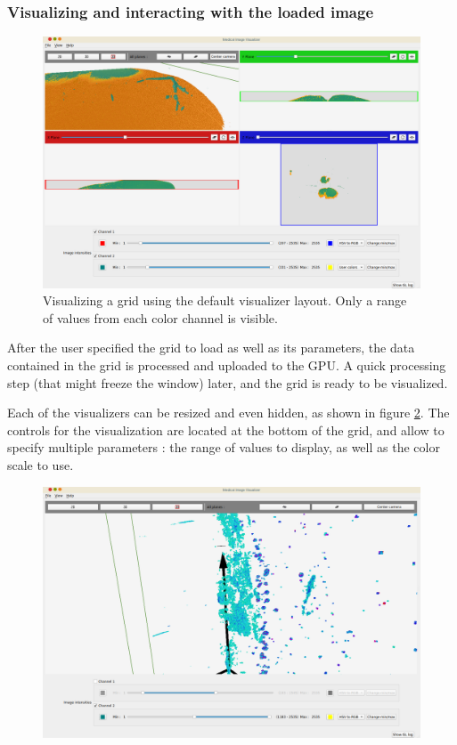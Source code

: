 {	%
	\subsubsection{Visualizing and interacting with the loaded image}
	{
		\begin{figure}[h]
			\centering
			\label{figure:program_default}
			\includegraphics[width=.8\textwidth]{./img/program_03.png}
			\caption{Visualizing a grid using the default visualizer layout. Only a range of values from each color channel is visible.}
		\end{figure}
		After the user specified the grid to load as well as its parameters, the data contained in the grid is processed and uploaded to the GPU. A quick processing step (that might freeze the window) later, and the grid is ready to be visualized.\par
		Each of the visualizers can be resized and even hidden, as shown in figure \ref{figure:program_centered01}. The controls for the visualization are located at the bottom of the grid, and allow to specify multiple parameters : the range of values to display, as well as the color scale to use.\par\myparspace
		\begin{figure}[h]
			\centering
			\label{figure:program_centered01}
			\includegraphics[width=.8\textwidth]{./img/program_02.png}

\end{figure}}}
